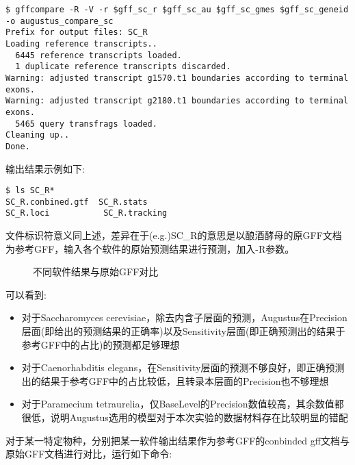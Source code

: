 \documentclass[12pt]{ctexart}
\begin{document}
\begin{lstlisting}
$ gffcompare -R -V -r $gff_sc_r $gff_sc_au $gff_sc_gmes $gff_sc_geneid -o augustus_compare_sc
Prefix for output files: SC_R
Loading reference transcripts..
  6445 reference transcripts loaded.
  1 duplicate reference transcripts discarded.
Warning: adjusted transcript g1570.t1 boundaries according to terminal exons.
Warning: adjusted transcript g2180.t1 boundaries according to terminal exons.
  5465 query transfrags loaded.
Cleaning up..
Done.
\end{lstlisting}

输出结果示例如下:

\begin{lstlisting}
$ ls SC_R*
SC_R.conbined.gtf  SC_R.stats
SC_R.loci           SC_R.tracking
\end{lstlisting}

文件标识符意义同上述，差异在于(e.g.)SC\_R的意思是以酿酒酵母的原GFF文档为参考GFF，输入各个软件的原始预测结果进行预测，加入-R参数。

\begin{figure}[htbp]
\centering
{}
\quad
{}
\quad
{}
\caption{不同软件结果与原始GFF对比}
\end{figure}

可以看到:

\begin{itemize}
    \item 对于Saccharomyces cerevisiae，除去内含子层面的预测，Augustus在Precision层面(即给出的预测结果的正确率)以及Sensitivity层面(即正确预测出的结果于参考GFF中的占比)的预测都足够理想
    \item 对于Caenorhabditis elegans，在Sensitivity层面的预测不够良好，即正确预测出的结果于参考GFF中的占比较低，且转录本层面的Precision也不够理想
    \item 对于Paramecium tetraurelia，仅BaseLevel的Precision数值较高，其余数值都很低，说明Augustus选用的模型对于本次实验的数据材料存在比较明显的错配
\end{itemize}

对于某一特定物种，分别把某一软件输出结果作为参考GFF的conbinded gff文档与原始GFF文档进行对比，运行如下命令:
\end{document}
